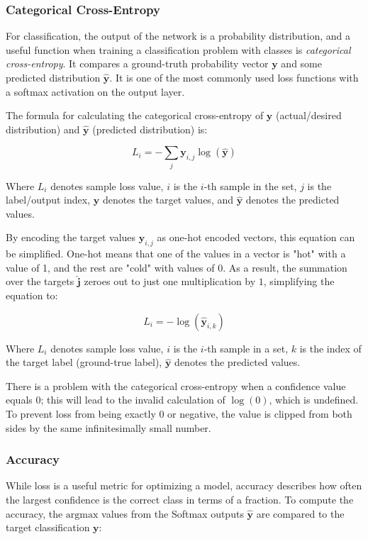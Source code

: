 \documentclass[a4paper]{article}
\newcommand{\vect}[1]{\bm{#1}}
\begin{document}
\subsubsection*{Categorical Cross-Entropy}
For classification, the output of the network is a probability distribution, and a useful function when training a classification problem with classes is \emph{categorical cross-entropy}. It compares a ground-truth probability vector $\vect{y}$ and some predicted distribution $\vect{\hat{y}}$. It is one of the most commonly used loss functions with a softmax activation on the output layer.

The formula for calculating the categorical cross-entropy of $\vect{y}$ (actual/desired distribution) and $\vect{\hat{y}}$ (predicted distribution) is:

\begin{equation*}
    L_i = -\sum_{j} \vect{y}_{i,j} \log({\vect{\hat{y}}})
\end{equation*}

Where $L_i$ denotes sample loss value, $i$ is the $i$-th sample in the set, $j$ is the label/output index, $\vect{y}$ denotes the target values, and $\vect{\hat{y}}$ denotes the predicted values.

By encoding the target values $\vect{y}_{i,j}$ as one-hot encoded vectors, this equation can be simplified. One-hot means that one of the values in a vector is "hot" with a value of 1, and the rest are "cold" with values of 0. As a result, the summation over the targets $\vect{\hat{j}}$ zeroes out to just one multiplication by $1$, simplifying the equation to:

\begin{equation*}
    L_i = -\log(\vect{\hat{y}}_{i,k})
\end{equation*}

Where $L_i$ denotes sample loss value, $i$ is the $i$-th sample in a set, $k$ is the index of the target label (ground-true label), $\vect{\hat{y}}$ denotes the predicted values.

There is a problem with the categorical cross-entropy when a confidence value equals $0$; this will 
lead to the invalid calculation of $\log(0)$, which is undefined. To prevent loss from being exactly $0$ or negative, the value is clipped from both sides by the same infinitesimally small number.

\subsubsection*{Accuracy}
While loss is a useful metric for optimizing a model, accuracy describes how often the largest 
confidence is the correct class in terms of a fraction. To compute the accuracy, the $\text{argmax}$ values from the Softmax outputs $\vect{\hat{y}}$ are compared to the target classification $\vect{y}$:
\end{document}
